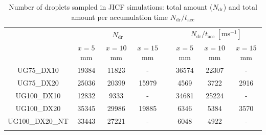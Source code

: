 
\begin{table}[!h]
\centering
\caption{Number of droplets sampled in JICF simulations: total amount ($N_\mathrm{dr}$) and total amount per accumulation time $N_\mathrm{dr}/t_\mathrm{acc}$}
\begin{tabular}{cccccccc}
\thickhline
\multirow{2}{*}{ \textbf{Case}}  & \multicolumn{3}{c}{$N_\mathrm{dr}$} & & \multicolumn{3}{c}{$N_\mathrm{dr}/t_\mathrm{acc}~[\mathrm{ms}^{-1}]$} \\
\cline{2-4} \cline{6-8}
& $x = 5$ mm & $x = 10$ mm & $x = 15$ mm &  & $x = 5$ mm & $x = 10$ mm & $x = 15$ mm  \\
\thickhline 
UG75\_DX10  & 19384 & 11823 & -  & & 36574 & 22307 & - \\
UG75\_DX20  & 25036 & 20399 & 15979  & & 4569 & 3722 & 2916 \\
UG100\_DX10 & 12832 & 9333 & -  & & 34681 & 25224 & - \\
UG100\_DX20 & 35345 & 29986 & 19885  & & 6346 & 5384 & 3570 \\
UG100\_DX20\_NT & 33443 & 27221 & -  & & 6048 & 4922 & - \\
\thickhline
\end{tabular}
\label{tab:jicf_SLI_Ndr_accumulated}
\end{table}













